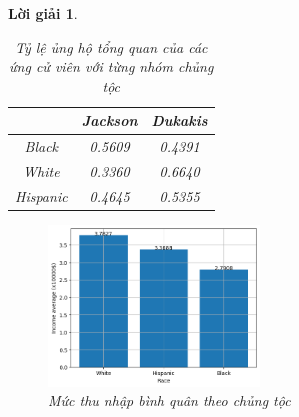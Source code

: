 \documentclass[14pt, a4paper]{article}
\theoremstyle{sltheorem}
\theoremstyle{soltheorem}
\newtheorem*{loigiai}{Lời giải}
\begin{document}
\begin{loigiai}
\begin{enumerate}
    \begin{table}[H]
        \centering
        \begin{tabular}{|c|c|c|}
        \hline
        & Jackson & Dukakis \\
        \hline
        Black & 0.5609 & 0.4391 \\
        \hline
        White & 0.3360 & 0.6640 \\
        \hline
        Hispanic & 0.4645 & 0.5355 \\
        \hline
        \end{tabular}
        \caption{Tỷ lệ ủng hộ tổng quan của các ứng cử viên với từng nhóm chủng tộc}
    \end{table}

    \begin{figure}[H]
        \centering
        \includegraphics[width=0.5\textwidth]{figures/race_group_income_average.png}
        \caption{Mức thu nhập bình quân theo chủng tộc}
        \label{fig:race_group_income_average}
    \end{figure}
    \end{enumerate}
\end{loigiai}


\newpage
\printbibliography[title={TÀI LIỆU THAM KHẢO}]
\end{document}
